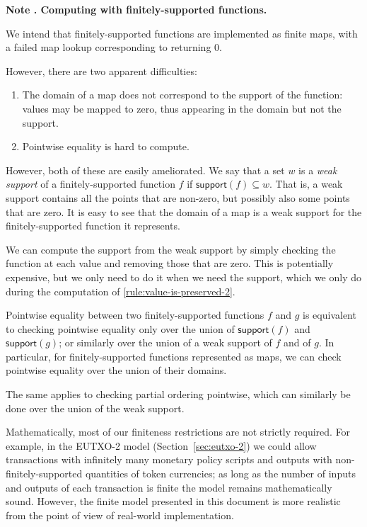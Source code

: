 \documentclass[a4paper]{article}
\newcounter{note}
\newcommand{\note}[1]{
  \bigskip
  \refstepcounter{note}
  \noindent\textbf{Note \thenote. #1}
}
\newcommand{\msf}[1]{\ensuremath{\mathsf{#1}}}
\newcommand{\support}{\msf{support}}
\begin{document}
\note{Computing with finitely-supported functions.}
\label{note:finitely-supported-functions}
We intend that finitely-supported functions are implemented as finite
maps, with a failed map lookup corresponding to returning 0.

However, there are two apparent difficulties:
\begin{enumerate}
  \item The domain of a map does not correspond to the support of the function:
    values may be mapped to zero, thus appearing in the domain but not the support.
  \item Pointwise equality is hard to compute.
\end{enumerate}

However, both of these are easily ameliorated. We say that a set $w$ is a \textit{weak support}
of a finitely-supported function $f$ if $\support(f) \subseteq w$. That is, a
weak support contains all the points that are non-zero, but possibly also some
points that are zero. It is easy to see that the domain of a map is a weak
support for the finitely-supported function it represents.

We can compute the support from the weak support by simply checking the function
at each value and removing those that are zero. This is potentially expensive,
but we only need to do it when we need the support, which we only do during the
computation of \cref{rule:value-is-preserved-2}.

Pointwise equality between two finitely-supported functions $f$ and $g$ is
equivalent to checking pointwise equality only over the union of $\support(f)$
and $\support(g)$; or similarly over the union of a weak support of $f$ and of
$g$. In particular, for finitely-supported functions represented as maps, we can
check pointwise equality over the union of their domains.

The same applies to checking partial ordering pointwise, which can similarly
be done over the union of the weak support.

\medskip

Mathematically, most of our finiteness restrictions are not strictly
required.  For example, in the EUTXO-2 model
(Section~\ref{sec:eutxo-2}) we could allow transactions with
infinitely many monetary policy scripts and outputs with
non-finitely-supported quantities of token currencies;  as long as the
number of inputs and outputs of each transaction is finite the model
remains mathematically sound.  However, the finite model presented in
this document is more realistic from the point of view of real-world
implementation.
\end{document}
